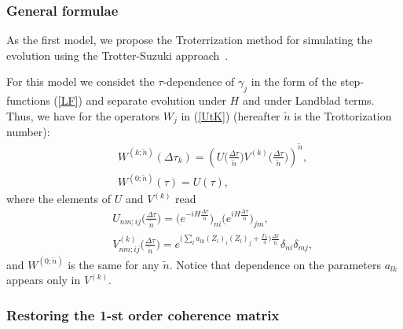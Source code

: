 \documentclass[pra,preprint,showpacs]{revtex4-1}
\begin{document}
\subsubsection{General formulae}
\label{Section:Trot}
As the first model, we propose the Troterrization method for simulating the evolution using the Trotter-Suzuki approach~\cite{Trotter,Suzuki}.
{For this model we considet the $\tau$-dependence of  $\gamma_j$ in the form of the  step-functions (\ref{LF})
and separate evolution under $H$ and under Landblad terms. Thus, we have for the operators $W_j$ in (\ref{UtK}) (hereafter $\tilde n$ is the Trottorization number): %
\begin{eqnarray}\label{Wk}
&&
W^{(k;\tilde n)}(\Delta\tau_k) =
\left(U\Big(\frac{\Delta \tau}{\tilde n}\Big) V^{(k)}\Big(\frac{\Delta \tau}{\tilde n}\Big)\right)^{\tilde n} ,\\\nonumber
&&
W^{(0;\tilde n)}(\tau) =U(\tau),
\end{eqnarray}
where the elements of $U$ and $V^{(k)}$ read
\begin{eqnarray}\label{UV}
&&
U_{nm;ij}\Big(\frac{\Delta \tau}{\tilde n}\Big) = \Big(e^{ -i H\frac{\Delta \tau}{\tilde n}} \Big)_{ni}\Big(e^{ i H\frac{\Delta \tau}{\tilde n}} \Big)_{jm}  ,\\\nonumber
&&
V^{(k)}_{nm;ij}\Big(\frac{\Delta \tau}{\tilde n}\Big) = e^{ \Big( \sum_l a_{lk} (Z_l )_i  (Z_l)_{j}  +\frac{\Gamma_k}{4}\Big)    \frac{\Delta \tau}{\tilde n}} \delta_{ni}\delta_{mj},
\end{eqnarray}
and $W^{(0;\tilde n)}$ is the same for any $\tilde n$.
Notice that dependence on the parameters $a_{lk}$ appears only in $V^{(k)}$.


\subsubsection{Restoring the 1-st order coherence matrix}

}
\end{document}
